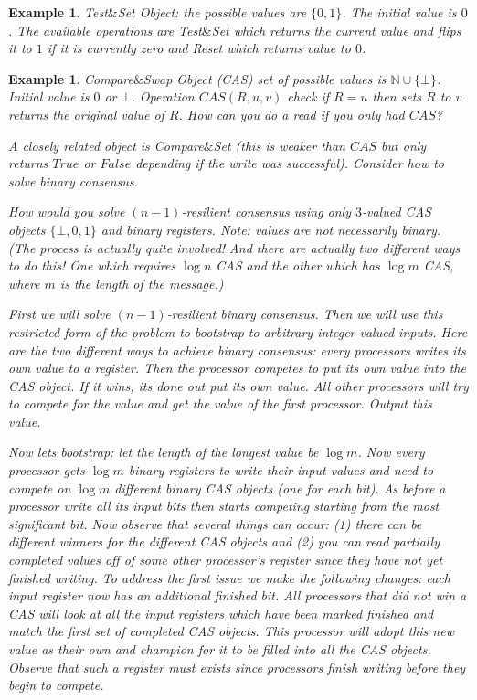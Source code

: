 \documentclass[twoside]{article}
\newtheorem{example}[theorem]{Example}
\newcommand\N{\mathbb{N}}
\begin{document}
\begin{example}
Test$\&$Set Object: the possible values are $\{0,1\}$. The initial value is $0$. The available operations are Test$\&$Set which returns the current value and flips it to $1$ if it is currently zero and Reset which returns value to $0$.
\end{example}

\begin{example}
Compare$\&$Swap Object (CAS) set of possible values is $\N \cup \{\bot\}$. Initial value is $0$ or $\bot$. Operation $CAS(R, u, v)$ check if $R = u$ then sets $R$ to $v$ returns the original value of $R$. How can you do a read if you only had $CAS$?

A closely related object is Compare$\&$Set (this is weaker than $CAS$ but only returns $True$ or $False$ depending if the write was successful). Consider how to solve binary consensus. 

How would you solve $(n-1)$-resilient consensus using only $3$-valued CAS objects $\{\bot, 0, 1\}$ and binary registers. Note: values are not necessarily binary. (The process is actually quite involved! And there are actually two different ways to do this! One which requires $\log n$ CAS and the other which has $\log m$ CAS, where $m$ is the length of the message.)

First we will solve $(n-1)$-resilient binary consensus. Then we will use this restricted form of the problem to bootstrap to arbitrary integer valued inputs. Here are the two different ways to achieve binary consensus: every processors writes its own value to a register. Then the processor competes to put its own value into the CAS object. If it wins, its done out put its own value. All other processors will try to compete for the value and get the value of the first processor. Output this value.

Now lets bootstrap: let the length of the longest value be $\log m$. Now every processor gets $\log m$ binary registers to write their input values and need to compete on $\log m$ different binary CAS objects (one for each bit). As before a processor write all its input bits then starts competing starting from the most significant bit. Now observe that several things can occur: (1) there can be different winners for the different CAS objects and (2) you can read partially completed values off of some other processor's register since they have not yet finished writing. To address the first issue we make the following changes: each input register now has an additional \emph{finished} bit. All processors that did not win a CAS will look at all the input registers which have been marked finished and match the first set of completed CAS objects. This processor will adopt this new value as their own and champion for it to be filled into all the CAS objects. Observe that such a register must exists since processors finish writing before they begin to compete. 


\end{example}
\end{document}
